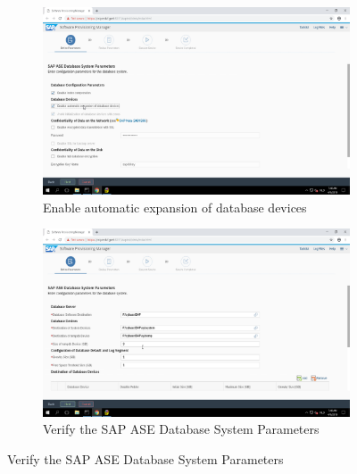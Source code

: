 \begin{figure}[!htb]\ContinuedFloat
    \begin{subfigure}{0.5\textwidth}
        \captionsetup{width=0.8\linewidth}
        \includegraphics[width=0.9\linewidth]{img/Methodologie/SAP22.png}
        \centering
        \caption{Enable automatic expansion of database devices}
    \end{subfigure}
    \begin{subfigure}{0.5\textwidth}
        \captionsetup{width=0.8\linewidth}
        \includegraphics[width=0.9\linewidth]{img/Methodologie/SAP21.png} 
        \centering
        \caption{Verify the SAP ASE Database System Parameters}
    \end{subfigure}
\end{figure}
